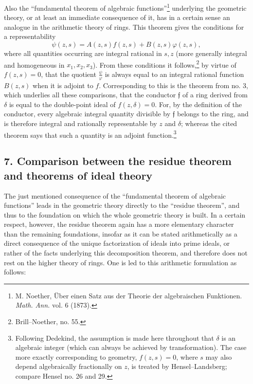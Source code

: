 \documentclass[11pt]{article}
\providecommand{\frf}{\mathfrak f}
\begin{document}
Also the ``fundamental theorem of algebraic functions''\footnote{M. Noether, Über einen Satz aus der Theorie der algebraischen Funktionen. \emph{Math. Ann.} vol. 6 (1873).} underlying the geometric theory, or at least an immediate consequence of it, has in a certain sense an analogue in the arithmetic theory of rings. This theorem gives the conditions for a representability
\[
\psi(z,s)=A(z,s)f(z,s)+B(z,s)\varphi(z,s),
\]
where all quantities occurring are integral rational in \(s,z\) (more generally integral and homogeneous in \(x_1,x_2,x_3\)). From these conditions it follows,\footnote{Brill--Noether, no. 55.} by virtue of \(f(z,s)=0\), that the quotient \(\frac{\psi}{\varphi}\) is always equal to an integral rational function \(B(z,s)\) when it is adjoint to \(f\). Corresponding to this is the theorem from no. 3, which underlies all these comparisons, that the conductor \(\frf\) of a ring derived from \(\delta\) is equal to the double-point ideal of \(f(z,\delta)=0\). For, by the definition of the conductor, every algebraic integral quantity divisible by \(\frf\) belongs to the ring, and is therefore integral and rationally representable by \(z\) and \(\delta\); whereas the cited theorem says that such a quantity is an adjoint function.\footnote{Following Dedekind, the assumption is made here throughout that \(\delta\) is an algebraic integer (which can always be achieved by transformation). The case more exactly corresponding to geometry, \(f(z,s)=0\), where \(s\) may also depend algebraically fractionally on \(z\), is treated by Hensel--Landsberg; compare Hensel no. 26 and 29.}

\subsection*{7. Comparison between the residue theorem and theorems of ideal theory}
The just mentioned consequence of the ``fundamental theorem of algebraic functions'' leads in the geometric theory directly to the ``residue theorem'', and thus to the foundation on which the whole geometric theory is built. In a certain respect, however, the residue theorem again has a more elementary character than the remaining foundations, insofar as it can be stated arithmetically as a direct consequence of the unique factorization of ideals into prime ideals, or rather of the facts underlying this decomposition theorem, and therefore does not rest on the higher theory of rings. One is led to this arithmetic formulation as follows:
\end{document}
